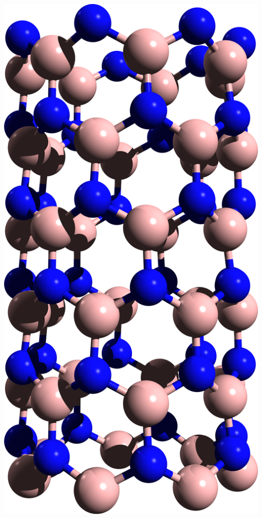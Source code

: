 \documentclass{beamer}
\begin{document}
\begin{frame}
\begin{columns}
\begin{columns}
\includegraphics[width=1.0\textwidth]{figs/7-bnnt-1.png}


\end{columns}
\end{columns}
\end{frame}
\end{document}
